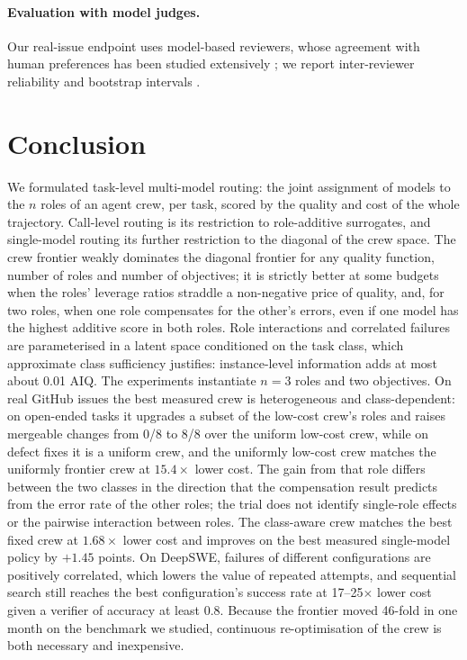 \documentclass[11pt,a4paper]{article}
\theoremstyle{definition}
\theoremstyle{remark}
\theoremstyle{definition}
\begin{document}
\paragraph{Evaluation with model judges.}
Our real-issue endpoint uses model-based reviewers, whose agreement with human preferences has been studied extensively \cite{zheng2023judge}; we report inter-reviewer reliability \cite{shrout1979,cohen1960} and bootstrap intervals \cite{efron1993}.

\section{Conclusion}

We formulated task-level multi-model routing: the joint assignment of models to the $n$ roles of an agent crew, per task, scored by the quality and cost of the whole trajectory. Call-level routing is its restriction to role-additive surrogates, and single-model routing its further restriction to the diagonal of the crew space. The crew frontier weakly dominates the diagonal frontier for any quality function, number of roles and number of objectives; it is strictly better at some budgets when the roles' leverage ratios straddle a non-negative price of quality, and, for two roles, when one role compensates for the other's errors, even if one model has the highest additive score in both roles. Role interactions and correlated failures are parameterised in a latent space conditioned on the task class, which approximate class sufficiency justifies: instance-level information adds at most about 0.01 AIQ. The experiments instantiate $n=3$ roles and two objectives. On real GitHub issues the best measured crew is heterogeneous and class-dependent: on open-ended tasks it upgrades a subset of the low-cost crew's roles and raises mergeable changes from 0/8 to 8/8 over the uniform low-cost crew, while on defect fixes it is a uniform crew, and the uniformly low-cost crew matches the uniformly frontier crew at $15.4\times$ lower cost. The gain from that role differs between the two classes in the direction that the compensation result predicts from the error rate of the other roles; the trial does not identify single-role effects or the pairwise interaction between roles. The class-aware crew matches the best fixed crew at $1.68\times$ lower cost and improves on the best measured single-model policy by $+1.45$ points. On DeepSWE, failures of different configurations are positively correlated, which lowers the value of repeated attempts, and sequential search still reaches the best configuration's success rate at 17--25$\times$ lower cost given a verifier of accuracy at least 0.8. Because the frontier moved 46-fold in one month on the benchmark we studied, continuous re-optimisation of the crew is both necessary and inexpensive.
\end{document}
